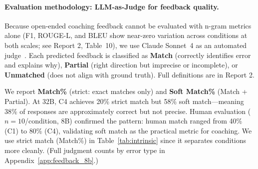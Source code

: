 \documentclass{article}
\begin{document}
\paragraph{Evaluation methodology: LLM-as-Judge for feedback quality.}

Because open-ended coaching feedback cannot be evaluated with n-gram metrics alone
(F1, ROUGE-L, and BLEU show near-zero variation across conditions at both scales;
see Report 2, Table~10), we use Claude Sonnet~4 as an automated judge~\cite{zheng2023llmasajudge}. Each predicted
feedback is classified as \textbf{Match} (correctly identifies error and explains
why), \textbf{Partial} (right direction but imprecise or incomplete), or
\textbf{Unmatched} (does not align with ground truth). Full definitions are in Report 2.

We report \textbf{Match\%} (strict: exact matches only) and \textbf{Soft Match\%}
(Match + Partial). At 32B, C4 achieves 20\% strict match but 58\% soft
match---meaning 38\% of responses are approximately correct but not precise.
Human evaluation ($n{=}10$/condition, 8B) confirmed the pattern: human match
ranged from 40\% (C1) to 80\% (C4), validating soft match as the practical metric
for coaching. We use strict match (Match\%) in Table~\ref{tab:intrinsic} since it
separates conditions more cleanly. (Full judgment counts by error type in
Appendix~\ref{app:feedback_8b}.)

\clearpage
\end{document}
